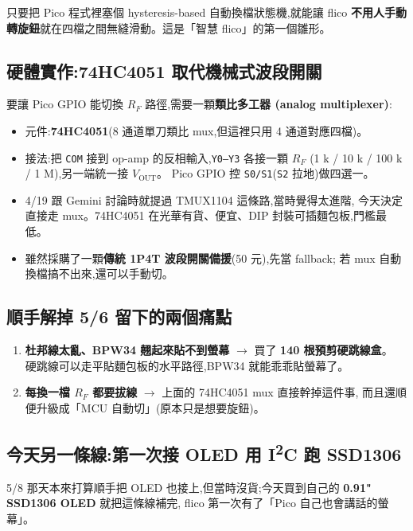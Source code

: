 只要把 Pico 程式裡塞個 hysteresis-based 自動換檔狀態機,就能讓 flico
\textbf{不用人手動轉旋鈕}就在四檔之間無縫滑動。這是「智慧 flico」的第一個雛形。

\subsection*{硬體實作:74HC4051 取代機械式波段開關}

要讓 Pico GPIO 能切換 \(R_F\) 路徑,需要一顆\textbf{類比多工器 (analog multiplexer)}:

\begin{itemize}[leftmargin=2em,itemsep=0pt]
  \item 元件:\textbf{74HC4051}(8 通道單刀類比 mux,但這裡只用 4 通道對應四檔)。
  \item 接法:把 \texttt{COM} 接到 op-amp 的反相輸入,\texttt{Y0--Y3} 各接一顆 \(R_F\)
        (1 k / 10 k / 100 k / 1 M),另一端統一接 \(V_\text{OUT}\)。
        Pico GPIO 控 \texttt{S0/S1}(\texttt{S2} 拉地)做四選一。
  \item 4/19 跟 Gemini 討論時就提過 TMUX1104 這條路,當時覺得太進階,
        今天決定直接走 mux。74HC4051 在光華有貨、便宜、DIP 封裝可插麵包板,門檻最低。
  \item 雖然採購了一顆\textbf{傳統 1P4T 波段開關備援}(50 元),先當 fallback;
        若 mux 自動換檔搞不出來,還可以手動切。
\end{itemize}

\subsection*{順手解掉 5/6 留下的兩個痛點}

\begin{enumerate}[leftmargin=2em,itemsep=2pt]
  \item \textbf{杜邦線太亂、BPW34 翹起來貼不到螢幕} \(\to\) 買了 \textbf{140 根預剪硬跳線盒}。
        硬跳線可以走平貼麵包板的水平路徑,BPW34 就能乖乖貼螢幕了。
  \item \textbf{每換一檔 \(R_F\) 都要拔線} \(\to\) 上面的 74HC4051 mux 直接幹掉這件事,
        而且還順便升級成「MCU 自動切」(原本只是想要旋鈕)。
\end{enumerate}

\subsection*{今天另一條線:第一次接 OLED 用 I\textsuperscript{2}C 跑 SSD1306}

5/8 那天本來打算順手把 OLED 也接上,但當時沒貨;今天買到自己的 \textbf{0.91" SSD1306 OLED} 就把這條線補完,
flico 第一次有了「Pico 自己也會講話的螢幕」。

